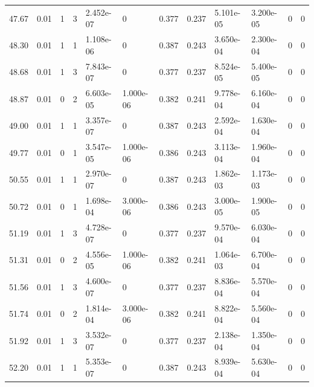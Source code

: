\documentclass[preview]{standalone}
\begin{document}
{{{\begin{tabular}{L{1.2cm}C{1.2cm} C{0.3cm}C{0.5cm} C{1.4cm}C{1.4cm} C{1.4cm}C{1.4cm} C{1.6cm}C{1.6cm} C{1.6cm}C{1.6cm}}
  47.67  &  0.01  & 1     &  3 &  2.452e-07  & 0  &  0.377&   0.237& 5.101e-05 & 3.200e-05   &  0 & 0  \\ 
  48.30  &  0.01  & 1     &  1 &  1.108e-06  & 0  &  0.387&   0.243& 3.650e-04 & 2.300e-04   &  0 & 0  \\ 
  48.68  &  0.01  & 1     &  3 &  7.843e-07  & 0  &  0.377&   0.237& 8.524e-05 & 5.400e-05   &  0 & 0  \\ 
  48.87  &  0.01  & 0     &  2 &  6.603e-05  & 1.000e-06  &  0.382&   0.241& 9.778e-04 & 6.160e-04   &  0 & 0  \\ 
  49.00  &  0.01  & 1     &  1 &  3.357e-07  & 0  &  0.387&   0.243& 2.592e-04 & 1.630e-04   &  0 & 0  \\ 
  49.77  &  0.01  & 0     &  1 &  3.547e-05  & 1.000e-06  &  0.386&   0.243& 3.113e-04 & 1.960e-04   &  0 & 0  \\ 
  50.55  &  0.01  & 1     &  1 &  2.970e-07  & 0  &  0.387&   0.243& 1.862e-03 & 1.173e-03   &  0 & 0  \\ 
  50.72  &  0.01  & 0     &  1 &  1.698e-04  & 3.000e-06  &  0.386&   0.243& 3.000e-05 & 1.900e-05   &  0 & 0  \\ 
  51.19  &  0.01  & 1     &  3 &  4.728e-07  & 0  &  0.377&   0.237& 9.570e-04 & 6.030e-04   &  0 & 0  \\ 
  51.31  &  0.01  & 0     &  2 &  4.556e-05  & 1.000e-06  &  0.382&   0.241& 1.064e-03 & 6.700e-04   &  0 & 0  \\ 
  51.56  &  0.01  & 1     &  3 &  4.600e-07  & 0  &  0.377&   0.237& 8.836e-04 & 5.570e-04   &  0 & 0  \\ 
  51.74  &  0.01  & 0     &  2 &  1.814e-04  & 3.000e-06  &  0.382&   0.241& 8.822e-04 & 5.560e-04   &  0 & 0  \\ 
  51.92  &  0.01  & 1     &  3 &  3.532e-07  & 0  &  0.377&   0.237& 2.138e-04 & 1.350e-04   &  0 & 0  \\ 
  52.20  &  0.01  & 1     &  1 &  5.353e-07  & 0  &  0.387&   0.243& 8.939e-04 & 5.630e-04   &  0 & 0  \\ 
\hline 
\end{tabular} 

}}}
\end{document}
